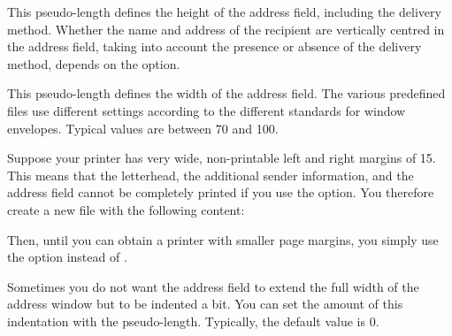 \begin{Declaration}
\end{Declaration}
This pseudo-length defines the height of the address field, including the
delivery method. Whether the name and address of the recipient are vertically
centred in the address field, taking into account the presence or absence of
the delivery method, depends on the 
option.%
\EndIndexGroup
 

\begin{Declaration}
\end{Declaration}
This pseudo-length defines the width of the address field. The various
predefined  files use different settings according to the different
standards for window envelopes. Typical values are between 70 and
100.
\begin{Example}
  Suppose your printer has very wide, non-printable left and right margins of 15.
  This means that the letterhead, the additional sender information, and the address field cannot
  be completely printed if you use the  option. You therefore
  create a new  file with the following content:
  Then, until you can obtain a printer with smaller page margins, you
  simply use the option  instead of .%
\end{Example}%
%
\EndIndexGroup


\begin{Declaration}
\end{Declaration}
Sometimes you do not want the address field to extend the full width of the
address window but to be indented a bit. You can set the amount of this
indentation with the  pseudo-length. Typically, the
default value is 0.

